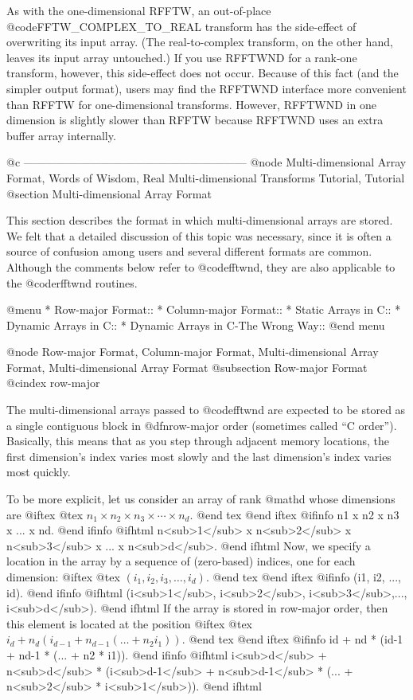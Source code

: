 As with the one-dimensional RFFTW, an out-of-place
@code{FFTW_COMPLEX_TO_REAL} transform has the side-effect of overwriting
its input array.  (The real-to-complex transform, on the other hand,
leaves its input array untouched.)  If you use RFFTWND for a rank-one
transform, however, this side-effect does not occur.  Because of this
fact (and the simpler output format), users may find the RFFTWND
interface more convenient than RFFTW for one-dimensional transforms.
However, RFFTWND in one dimension is slightly slower than RFFTW because
RFFTWND uses an extra buffer array internally.

@c ------------------------------------------------------------
@node Multi-dimensional Array Format, Words of Wisdom, Real Multi-dimensional Transforms Tutorial, Tutorial
@section Multi-dimensional Array Format

This section describes the format in which multi-dimensional arrays are
stored.  We felt that a detailed discussion of this topic was necessary,
since it is often a source of confusion among users and several
different formats are common.  Although the comments below refer to
@code{fftwnd}, they are also applicable to the @code{rfftwnd} routines.

@menu
* Row-major Format::            
* Column-major Format::         
* Static Arrays in C::          
* Dynamic Arrays in C::         
* Dynamic Arrays in C-The Wrong Way::  
@end menu

@node Row-major Format, Column-major Format, Multi-dimensional Array Format, Multi-dimensional Array Format
@subsection Row-major Format
@cindex row-major

The multi-dimensional arrays passed to @code{fftwnd} are expected to be
stored as a single contiguous block in @dfn{row-major} order (sometimes
called ``C order'').  Basically, this means that as you step through
adjacent memory locations, the first dimension's index varies most
slowly and the last dimension's index varies most quickly.

To be more explicit, let us consider an array of rank @math{d} whose
dimensions are
@iftex
@tex
$n_1 \times n_2 \times n_3 \times \cdots \times n_d$.
@end tex
@end iftex
@ifinfo
n1 x n2 x n3 x ... x nd.
@end ifinfo
@ifhtml
n<sub>1</sub> x n<sub>2</sub> x n<sub>3</sub> x ... x n<sub>d</sub>.
@end ifhtml
Now, we specify a location in the array by a sequence of (zero-based) indices,
one for each dimension:
@iftex
@tex
$(i_1, i_2, i_3, \ldots, i_d)$.
@end tex
@end iftex
@ifinfo
(i1, i2, ..., id).
@end ifinfo
@ifhtml
(i<sub>1</sub>, i<sub>2</sub>, i<sub>3</sub>,..., i<sub>d</sub>).
@end ifhtml
If the array is stored in row-major
order, then this element is located at the position
@iftex
@tex
$i_d + n_d (i_{d-1} + n_{d-1} (\ldots + n_2 i_1))$.
@end tex
@end iftex
@ifinfo
id + nd * (id-1 + nd-1 * (... + n2 * i1)).
@end ifinfo
@ifhtml
i<sub>d</sub> + n<sub>d</sub> * (i<sub>d-1</sub> + n<sub>d-1</sub> * (... + n<sub>2</sub> * i<sub>1</sub>)).
@end ifhtml

